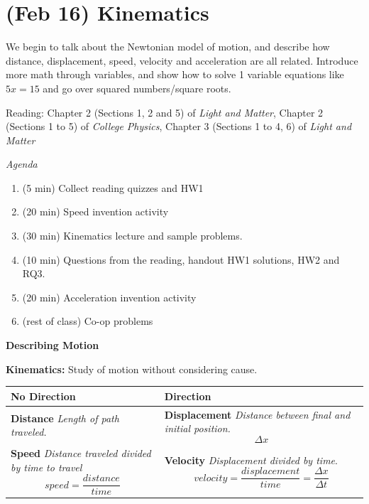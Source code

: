 \documentclass[12pt]{article}
\begin{document}
\clearpage


\section{(Feb 16) \textbf{Kinematics}}
	
	We begin to talk about the Newtonian model of motion, and describe how distance, displacement, speed, velocity and acceleration are all related. Introduce more math through variables, and show how to solve 1 variable equations like $5x=15$ and go over squared numbers/square roots. 	
	
	Reading: Chapter 2 (Sections 1, 2 and 5) of \textit{Light and Matter}, Chapter 2 (Sections 1 to 5) of \textit{College Physics}, Chapter 3 (Sections 1 to 4, 6) of \textit{Light and Matter}

\textit{Agenda}	
	
	\begin{enumerate}
		\item (5 min) Collect reading quizzes and HW1
		\item (20 min) Speed invention activity
		\item (30 min) Kinematics lecture and sample problems.
		\item (10 min) Questions from the reading, handout HW1 solutions, HW2 and RQ3.
		\item (20 min) Acceleration invention activity
		\item (rest of class) Co-op problems
	\end{enumerate}
	
\noindent \textbf{\large Describing Motion}

\noindent \textbf{Kinematics:} Study of motion without considering cause.
\vspace{0.1in}

\noindent \begin{tabularx}{\textwidth}{X | X}
 \textbf{No Direction} & \textbf{Direction} \\
 \hline
 \textbf{Distance} \newline \textit{Length of path traveled.} &  \textbf{Displacement} \newline \textit{Distance between final and initial position.} \begin{equation}
 \Delta x
 \end{equation}
 \\ 
 \textbf{Speed} \newline \textit{Distance traveled divided by time to travel} \begin{equation}
 speed = \frac{distance}{time}
 \end{equation} & \textbf{Velocity} \newline \textit{Displacement divided by time}. \begin{equation}
 velocity = \frac{displacement}{time} = \frac{\Delta x}{\Delta t}
 \end{equation}
\end{tabularx}
\vspace{0.1in}
\end{document}
